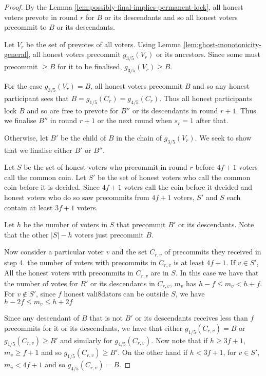 \documentclass{article}
\begin{document}
\begin{proof} By the Lemma \ref{lem:possibly-final-implies-permanent-lock}, all honest voters prevote in round $r$ for $B$ or its descendants and so all honest voters precommit to $B$ or its descendants.

Let $V_r$ be the set of prevotes of all voters.  Using Lemma \ref{lem:ghost-monotonicity-general}, all honest voters precommit $g_{3/5}(V_r)$ or its ancestors. Since some must precommit $\geq B$ for it to be finalised,  $g_{3/5}(V_r) \geq B$.

For the case $g_{3/5}(V_r)=B$, all honest voters precommit $B$ and so any honest participant sees that
$B = g_{1/5}(C_r) = g_{4/5}(C_r)$. Thus all honest participants
lock $B$ and so are free to prevote for $B''$ or its descendants in round $r+1$. Thus we finalise $B''$ in round $r+1$ or the next round when $s_r=1$ after that.

Otherwise, let $B'$ be the child of $B$ in the chain of $g_{3/5}(V_r)$. We seek to show that we finalise either $B'$ or $B''$.

Let $S$ be the set of honest voters who precommit in round $r$ before $4f+1$ voters call the common coin. Let $S'$ be the set of honest voters who call the common coin before it is decided. %
Since $4f+1$  voters call the coin before it decided and honest voters who do so saw precommits from $4f+1$ voters, $S'$ and $S$ each contain at least $3f+1$ voters.

Let $h$ be the number of voters in $S$ that precommit $B'$ or its descendants. Note that the other $|S|-h$ voters just precommit $B$.

Now consider a particular voter $v$ and the set $C_{r,v}$ of precommits they received in step 4. the number of voters with precommits in  $C_{r,v}$ is at least $4f+1$. 
If $v \in S'$,
All the honest voters  
with precommits in $C_{r,v}$ are in $S$. In this case we have that the number of votes for $B'$ or its descendants in $C_{r,v}$, $m_v$ has $h-f \leq m_v < h+f$. For $v \notin S'$, since $f$ honest vali8dators can be outside $S$, we have $h-2f \leq m_v \leq h+2f$ 

Since any descendant of $B$ that is not $B'$ or its descendants receives less than $f$ precommits for it or its descendants, we have that either $g_{1/5}(C_{r,v})=B$ or $g_{1/5}(C_{r,v})\geq B'$ and similarly for $g_{4/5}(C_{r,v})$. Now note that if $h \geq 3f+1$, $m_v \geq f+1$ and so $g_{1/5}(C_{r,v}) \geq B'$. On the other hand if $h < 3f+1$, for $v \in S'$, $m_v < 4f+1$ and so $g_{4/5}(C_{r,v})=B$.


\end{proof}
\end{document}
